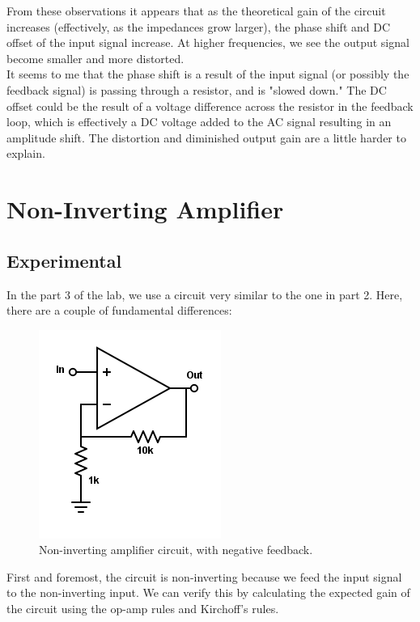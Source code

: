 \documentclass[11pt]{article}
\begin{document}
From these observations it appears that as the theoretical gain of the circuit increases (effectively, as the impedances grow larger), the phase shift and DC offset of the input signal increase. At higher frequencies, we see the output signal become smaller and more distorted.\\

It seems to me that the phase shift is a result of the input signal (or possibly the feedback signal) is passing through a resistor, and is "slowed down." The DC offset could be the result of a voltage difference across the resistor in the feedback loop, which is effectively a DC voltage added to the AC signal resulting in an amplitude shift. The distortion and diminished output gain are a little harder to explain.\\


\section{Non-Inverting Amplifier}
\subsection{Experimental}

In the part 3 of the lab, we use a circuit very similar to the one in part 2. Here, there are a couple of fundamental differences:\\

\begin{figure}[H]
    \centering
    \includegraphics[scale=0.5]{Diagrams/c-c.png}
    \caption{Non-inverting amplifier circuit, with negative feedback.}
    \label{circuit:c}
\end{figure}

First and foremost, the circuit is non-inverting because we feed the input signal to the non-inverting input. We can verify this by calculating the expected gain of the circuit using the op-amp rules and Kirchoff's rules.\\
\end{document}
